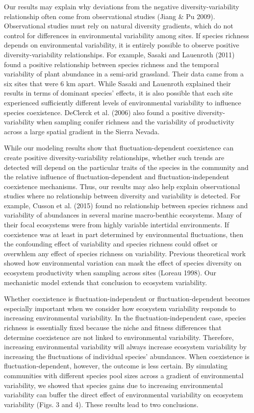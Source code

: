 \documentclass[12pt,]{article}
\begin{document}
Our results may explain why deviations from the negative
diversity-variability relationship often come from observational studies
(Jiang \& Pu 2009). Observational studies must rely on natural diversity
gradients, which do not control for differences in environmental
variability among sites. If species richness depends on environmental
variability, it is entirely possible to observe positive
diversity-variability relationships. For example, Sasaki and Lauenroth
(2011) found a positive relationship between species richness and the
temporal variability of plant abundance in a semi-arid grassland. Their
data came from a six sites that were 6 km apart. While Sasaki and
Lauenroth explained their results in terms of dominant species' effects,
it is also possible that each site experienced sufficiently different
levels of environmental variability to influence species coexistence.
DeClerck et al. (2006) also found a positive diversity-variability when
sampling conifer richness and the variability of productivity across a
large spatial gradient in the Sierra Nevada.

While our modeling results show that fluctuation-dependent coexistence
can create positive diversity-variability relationships, whether such
trends are detected will depend on the particular traits of the species
in the community and the relative influence of fluctuation-dependent and
fluctuation-independent coexistence mechanisms. Thus, our results may
also help explain observational studies where no relationship between
diversity and variability is detected. For example, Cusson et al. (2015)
found no relationship between species richness and variability of
abundances in several marine macro-benthic ecosystems. Many of their
focal ecosystems were from highly variable intertidal environments. If
coexistence was at least in part determined by environmental
fluctuations, then the confounding effect of variability and species
richness could offset or overwhlem any effect of species richness on
variability. Previous theoretical work showed how environmental
variation can mask the effect of species diversity on ecosystem
productivity when sampling across sites (Loreau 1998). Our mechanistic
model extends that conclusion to ecosystem variability.

Whether coexistence is fluctuation-independent or fluctuation-dependent
becomes especially important when we consider how ecosystem variability
responds to increasing environmental variability. In the
fluctuation-independent case, species richness is essentially fixed
because the niche and fitness differences that determine coexistence are
not linked to environmental variability. Therefore, increasing
environmental variability will always increase ecosystem variability by
increasing the fluctuations of individual species' abundances. When
coexistence is fluctuation-dependent, however, the outcome is less
certain. By simulating communities with different species pool sizes
across a gradient of environmental variability, we showed that species
gains due to increasing environmental variability can buffer the direct
effect of environmental variability on ecosystem variability (Figs. 3
and 4). These results lead to two conclusions.
\end{document}
